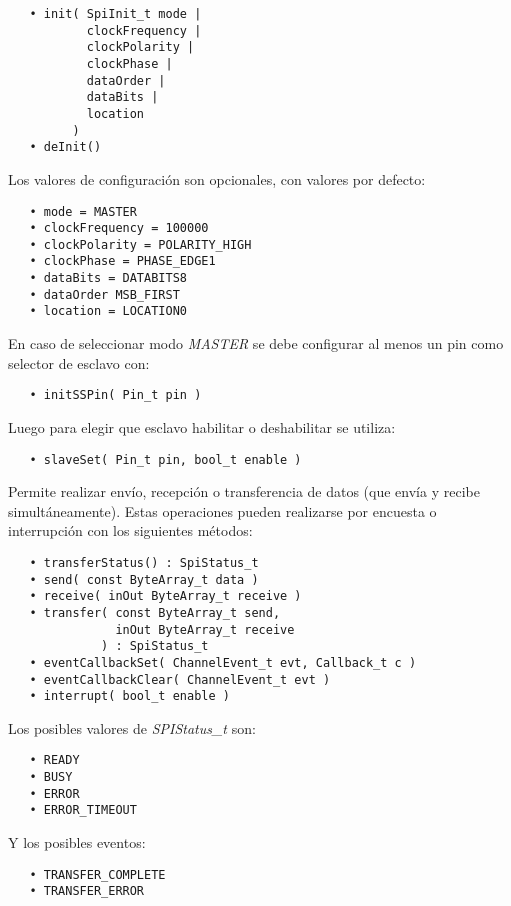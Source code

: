 \begin{verbatim}
   • init( SpiInit_t mode |
           clockFrequency |
           clockPolarity |
           clockPhase |
           dataOrder |
           dataBits |
           location
         )
   • deInit()
\end{verbatim}

Los valores de configuración son opcionales, con valores por defecto:

\begin{verbatim}
   • mode = MASTER
   • clockFrequency = 100000
   • clockPolarity = POLARITY_HIGH
   • clockPhase = PHASE_EDGE1
   • dataBits = DATABITS8
   • dataOrder MSB_FIRST
   • location = LOCATION0
\end{verbatim}

En caso de seleccionar modo \emph{MASTER} se debe configurar al menos un pin como selector de esclavo con:

\begin{verbatim}
   • initSSPin( Pin_t pin )
\end{verbatim}

Luego para elegir que esclavo habilitar o deshabilitar se utiliza:

\begin{verbatim}
   • slaveSet( Pin_t pin, bool_t enable )
\end{verbatim}

Permite realizar envío, recepción o transferencia de datos (que envía y recibe simultáneamente). Estas operaciones pueden realizarse por encuesta o interrupción con los siguientes métodos:

\begin{verbatim}
   • transferStatus() : SpiStatus_t
   • send( const ByteArray_t data )
   • receive( inOut ByteArray_t receive )
   • transfer( const ByteArray_t send, 
               inOut ByteArray_t receive
             ) : SpiStatus_t
   • eventCallbackSet( ChannelEvent_t evt, Callback_t c )
   • eventCallbackClear( ChannelEvent_t evt )
   • interrupt( bool_t enable )
\end{verbatim}

Los posibles valores de \emph{SPIStatus\_t} son:

\begin{verbatim}
   • READY
   • BUSY
   • ERROR
   • ERROR_TIMEOUT
\end{verbatim}

Y los posibles eventos:

\begin{verbatim}
   • TRANSFER_COMPLETE
   • TRANSFER_ERROR
\end{verbatim}


